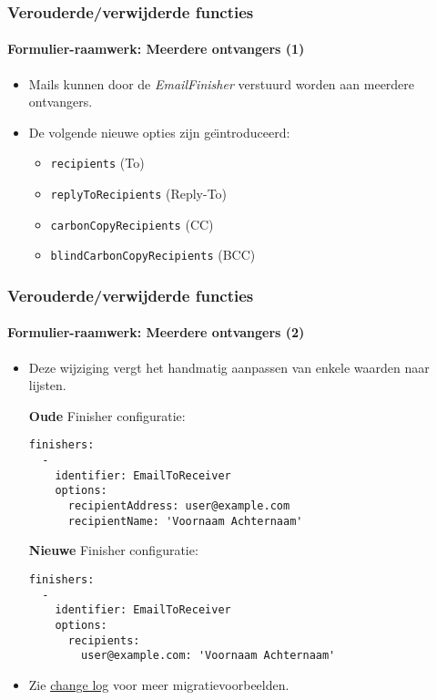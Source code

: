 \begin{frame}[fragile]
	\frametitle{Verouderde/verwijderde functies}
	\framesubtitle{Formulier-raamwerk: Meerdere ontvangers (1)}

	\begin{itemize}
		\item Mails kunnen door de \textit{EmailFinisher} verstuurd worden aan meerdere ontvangers.

		\item De volgende nieuwe opties zijn ge\"{\i}ntroduceerd:

			\begin{itemize}
				\item \texttt{recipients} (To)
				\item \texttt{replyToRecipients} (Reply-To)
				\item \texttt{carbonCopyRecipients} (CC)
				\item \texttt{blindCarbonCopyRecipients} (BCC)
			\end{itemize}

	\end{itemize}

\end{frame}


\begin{frame}[fragile]
	\frametitle{Verouderde/verwijderde functies}
	\framesubtitle{Formulier-raamwerk: Meerdere ontvangers (2)}

	\lstset{basicstyle=\tiny\ttfamily}

	\begin{itemize}
		\item Deze wijziging vergt het handmatig aanpassen van enkele waarden naar lijsten.

		\smaller\textbf{Oude} Finisher configuratie:\normalsize

\begin{lstlisting}
finishers:
  -
    identifier: EmailToReceiver
    options:
      recipientAddress: user@example.com
      recipientName: 'Voornaam Achternaam'
\end{lstlisting}

		\smaller\textbf{Nieuwe} Finisher configuratie:\normalsize

\begin{lstlisting}
finishers:
  -
    identifier: EmailToReceiver
    options:
      recipients:
        user@example.com: 'Voornaam Achternaam'
\end{lstlisting}

		\item Zie \href{https://docs.typo3.org/c/typo3/cms-core/10.0/en-us/Changelog/master/Deprecation-80420-EmailFinisherSingleAddressOptions.html}{change log}
			voor meer migratievoorbeelden.

	\end{itemize}

\end{frame}

